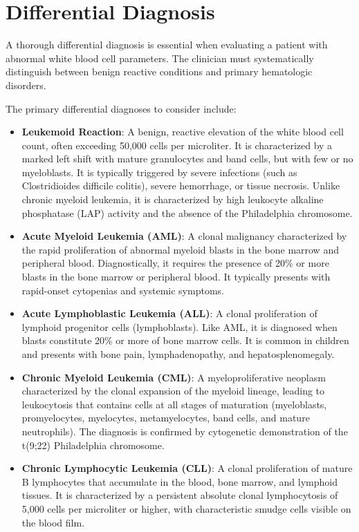 \section*{Differential Diagnosis}
A thorough differential diagnosis is essential when evaluating a patient with abnormal white blood cell parameters. The clinician must systematically distinguish between benign reactive conditions and primary hematologic disorders.

The primary differential diagnoses to consider include:
\begin{itemize}
  \item \textbf{Leukemoid Reaction}: A benign, reactive elevation of the white blood cell count, often exceeding 50,000 cells per microliter. It is characterized by a marked left shift with mature granulocytes and band cells, but with few or no myeloblasts. It is typically triggered by severe infections (such as Clostridioides difficile colitis), severe hemorrhage, or tissue necrosis. Unlike chronic myeloid leukemia, it is characterized by high leukocyte alkaline phosphatase (LAP) activity and the absence of the Philadelphia chromosome.
  \item \textbf{Acute Myeloid Leukemia (AML)}: A clonal malignancy characterized by the rapid proliferation of abnormal myeloid blasts in the bone marrow and peripheral blood. Diagnostically, it requires the presence of 20\% or more blasts in the bone marrow or peripheral blood. It typically presents with rapid-onset cytopenias and systemic symptoms.
  \item \textbf{Acute Lymphoblastic Leukemia (ALL)}: A clonal proliferation of lymphoid progenitor cells (lymphoblasts). Like AML, it is diagnosed when blasts constitute 20\% or more of bone marrow cells. It is common in children and presents with bone pain, lymphadenopathy, and hepatosplenomegaly.
  \item \textbf{Chronic Myeloid Leukemia (CML)}: A myeloproliferative neoplasm characterized by the clonal expansion of the myeloid lineage, leading to leukocytosis that contains cells at all stages of maturation (myeloblasts, promyelocytes, myelocytes, metamyelocytes, band cells, and mature neutrophils). The diagnosis is confirmed by cytogenetic demonstration of the t(9;22) Philadelphia chromosome.
  \item \textbf{Chronic Lymphocytic Leukemia (CLL)}: A clonal proliferation of mature B lymphocytes that accumulate in the blood, bone marrow, and lymphoid tissues. It is characterized by a persistent absolute clonal lymphocytosis of 5,000 cells per microliter or higher, with characteristic smudge cells visible on the blood film.

\end{itemize}
